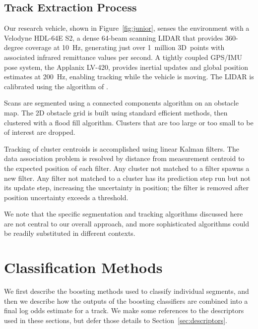 \documentclass[letterpaper, 10 pt, conference]{ieeeconf}  %
\begin{document}
\subsection{Track Extraction Process}

Our research vehicle, shown in Figure~\ref{fig:junior}, senses the environment with a Velodyne HDL-64E S2, a dense 64-beam scanning LIDAR that provides 360-degree coverage at 10~Hz, generating just over 1~million 3D~points with associated infrared remittance values per second.  A tightly coupled GPS/IMU pose system, the Applanix LV-420, provides inertial updates and global position estimates at 200~Hz, enabling tracking while the vehicle is moving.  The LIDAR is calibrated using the algorithm of \cite{Levinson2010}.

Scans are segmented using a connected components algorithm on an obstacle map.  The 2D obstacle grid is built using standard efficient methods, then clustered with a flood fill algorithm.  Clusters that are too large or too small to be of interest are dropped.

Tracking of cluster centroids is accomplished using linear Kalman filters.  The data association problem is resolved by distance from measurement centroid to the expected position of each filter.  Any cluster not matched to a filter spawns a new filter.  Any filter not matched to a cluster has its prediction step run but not its update step, increasing the uncertainty in position; the filter is removed after position uncertainty exceeds a threshold.

We note that the specific segmentation and tracking algorithms discussed here are not central to our overall approach, and more sophisticated algorithms could be readily substituted in different contexts.


\section{Classification Methods}
\label{sec:classification}

We first describe the boosting methods used to classify individual segments, and then we describe how the outputs of the boosting classifiers are combined into a final log odds estimate for a track.  We make some references to the descriptors used in these sections, but defer those details to Section~\ref{sec:descriptors}.
\end{document}
